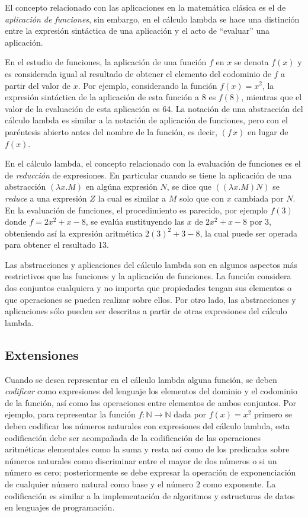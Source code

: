 El concepto relacionado con las aplicaciones en la matemática clásica es el de \emph{aplicación de funciones}, sin embargo, en el cálculo lambda se hace una distinción entre la expresión sintáctica de una aplicación y el acto de ``evaluar'' una aplicación.

En el estudio de funciones, la aplicación de una función \( f \) en \( x \) se denota \( f(x) \) y es considerada igual al resultado de obtener el elemento del codominio de \( f \) a partir del valor de \( x \). Por ejemplo, considerando la función \( f(x)=x^{2} \), la expresión sintáctica de la aplicación de esta función a 8 es \( f(8) \), mientras que el valor de la evaluación de esta aplicación es 64. La notación de una abstracción del cálculo lambda es similar a la notación de aplicación de funciones, pero con el paréntesis abierto antes del nombre de la función, es decir, \( (f\, x) \) en lugar de \( f(x) \).

En el cálculo lambda, el concepto relacionado con la evaluación de funciones es el de \emph{reducción} de expresiones. En particular cuando se tiene la aplicación de una abstracción \( (λx.M) \) en algúna expresión \( N \), se dice que \( ((λx.M) N) \) se \emph{reduce} a una expresión \( Z \) la cual es similar a \( M \) solo que con \( x \) cambiada por \( N \). En la evaluación de funciones, el procedimiento es parecido, por ejemplo \( f(3) \) donde \( f = 2x^{2}+x-8 \), se evalúa sustituyendo las \( x \) de \( 2x^{2}+x-8 \) por 3, obteniendo así la expresión aritmética \( 2(3)^{2}+3-8 \), la cual puede ser operada para obtener el resultado 13.

Las abstracciones y aplicaciones del cálculo lambda son en algunos aspectos más restrictivos que las funciones y la aplicación de funciones. La función considera dos conjuntos cualquiera y no importa que propiedades tengan sus elementos o que operaciones se pueden realizar sobre ellos. Por otro lado, las abstracciones y aplicaciones sólo pueden ser descritas a partir de otras expresiones del cálculo lambda.

\subsection{Extensiones}
\label{sec:extensiones}

Cuando se desea representar en el cálculo lambda alguna función, se deben \emph{codificar} como expresiones del lenguaje los elementos del dominio y el codominio de la función, así como las operaciones entre elementos de ambos conjuntos. Por ejemplo, para representar la función \( f \colon \mathbb{N} \to \mathbb{N} \) dada por \( f(x)=x^{2} \) primero se deben codificar los números naturales con expresiones del cálculo lambda, esta codificación debe ser acompañada de la codificación de las operaciones aritméticas elementales como la suma y resta así como de los predicados sobre números naturales como discriminar entre el mayor de dos números o si un número es cero; posteriormente se debe expresar la operación de exponenciación de cualquier número natural como base y el número \( 2 \) como exponente. La codificación es similar a la implementación de algoritmos y estructuras de datos en lenguajes de programación.


